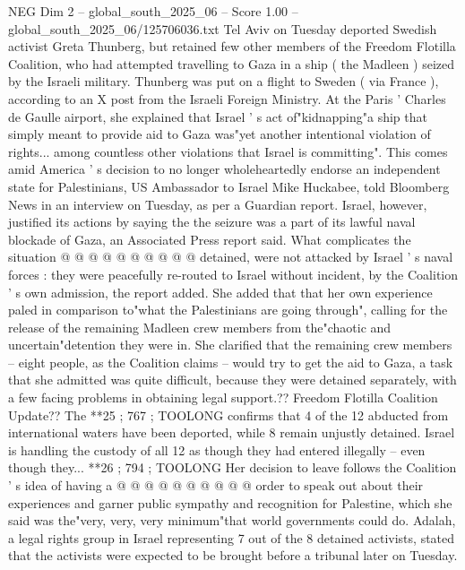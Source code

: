\begin{textsample}{NEG Dim 2 – global\_south\_2025\_06 – Score 1.00 – global\_south\_2025\_06/125706036.txt}  \label{ex:f2_neg_364}
Tel Aviv on Tuesday deported Swedish activist Greta Thunberg, but retained few other members of the Freedom Flotilla Coalition, who had attempted travelling to Gaza in a ship ( the Madleen ) seized by the Israeli military.
Thunberg was put on a flight to Sweden ( via France ), according to an X post from the Israeli Foreign Ministry.
At the Paris ' Charles de Gaulle airport, she explained that Israel ' s act of"kidnapping"a ship that simply meant to provide aid to Gaza was"yet another intentional violation of rights... among countless other violations that Israel is committing".
This comes amid America ' s decision to no longer wholeheartedly endorse an independent state for Palestinians, US Ambassador to Israel Mike Huckabee, told Bloomberg News in an interview on Tuesday, as per a Guardian report.
Israel, however, justified its actions by saying the the seizure was a part of its lawful naval blockade of Gaza, an Associated Press report said.
What complicates the situation @ @ @ @ @ @ @ @ @ @ detained, were not attacked by Israel ' s naval forces : they were peacefully re-routed to Israel without incident, by the Coalition ' s own admission, the report added.
She added that that her own experience paled in comparison to"what the Palestinians are going through", calling for the release of the remaining Madleen crew members from the"chaotic and uncertain"detention they were in.
She clarified that the remaining crew members -- eight people, as the Coalition claims -- would try to get the aid to Gaza, a task that she admitted was quite difficult, because they were detained separately, with a few facing problems in obtaining legal support.??
Freedom Flotilla Coalition Update??
The **25 ; 767 ; TOOLONG confirms that 4 of the 12 abducted from international waters have been deported, while 8 remain unjustly detained.
Israel is handling the custody of all 12 as though they had entered illegally -- even though they... **26 ; 794 ; TOOLONG Her decision to leave follows the Coalition ' s idea of having a @ @ @ @ @ @ @ @ @ @ order to speak out about their experiences and garner public sympathy and recognition for Palestine, which she said was the"very, very, very minimum"that world governments could do.
Adalah, a legal rights group in Israel representing 7 out of the 8 detained activists, stated that the activists were expected to be brought before a tribunal later on Tuesday.

\end{textsample}
